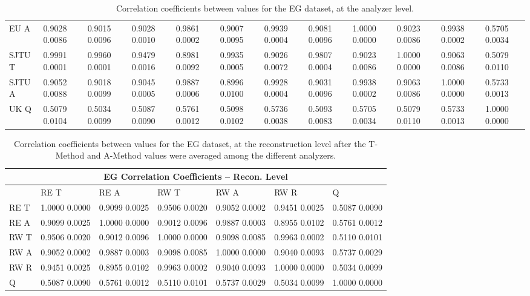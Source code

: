 \begin{landscape}
\begin{table}
\begin{tabularx}{1\linewidth}{@{\extracolsep{\fill}}lXXXXXXXXXXX}
	EU A   & 0.9028 0.0086 & 0.9015 0.0096 & 0.9028 0.0010 & 0.9861 0.0002 & 0.9007 0.0095 & 0.9939 0.0004 & 0.9081 0.0096 & 1.0000 0.0000 & 0.9023 0.0086 & 0.9938 0.0002 & 0.5705 0.0034  \\
	SJTU T & 0.9991 0.0001 & 0.9960 0.0001 & 0.9479 0.0016 & 0.8981 0.0092 & 0.9935 0.0005 & 0.9026 0.0072 & 0.9807 0.0004 & 0.9023 0.0086 & 1.0000 0.0000 & 0.9063 0.0086 & 0.5079 0.0110  \\
	SJTU A & 0.9052 0.0088 & 0.9018 0.0099 & 0.9045 0.0005 & 0.9887 0.0006 & 0.8996 0.0100 & 0.9928 0.0004 & 0.9031 0.0096 & 0.9938 0.0002 & 0.9063 0.0086 & 1.0000 0.0000 & 0.5733 0.0013  \\
	UK Q   & 0.5079 0.0104 & 0.5034 0.0099 & 0.5087 0.0090 & 0.5761 0.0012 & 0.5098 0.0102 & 0.5736 0.0038 & 0.5093 0.0083 & 0.5705 0.0034 & 0.5079 0.0110 & 0.5733 0.0013 & 1.0000 0.0000  \\
  \bottomrule
\end{tabularx}
\caption[]{Correlation coefficients between \R values for the EG dataset, at the analyzer level.}
\label{tab:Corrs_EG_analyzer}
\end{table}
\end{landscape}


\begin{table}
\setlength\tabcolsep{15pt}
\small
\centering
\renewcommand{\arraystretch}{1.4}
\begin{tabularx}{0.8\linewidth}{@{\extracolsep{\fill}}lXXXXXX}
  \toprule
  	\multicolumn{7}{c}{{\normalsize EG Correlation Coefficients -- Recon. Level}} \\
  \midrule
  	       & RE T & RE A & RW T & RW A & RW R & \quad Q \\
  \midrule
	RE T   & 1.0000 0.0000 & 0.9099 0.0025 & 0.9506 0.0020 & 0.9052 0.0002 & 0.9451 0.0025 & 0.5087 0.0090  \\
	RE A   & 0.9099 0.0025 & 1.0000 0.0000 & 0.9012 0.0096 & 0.9887 0.0003 & 0.8955 0.0102 & 0.5761 0.0012  \\
	RW T   & 0.9506 0.0020 & 0.9012 0.0096 & 1.0000 0.0000 & 0.9098 0.0085 & 0.9963 0.0002 & 0.5110 0.0101  \\
	RW A   & 0.9052 0.0002 & 0.9887 0.0003 & 0.9098 0.0085 & 1.0000 0.0000 & 0.9040 0.0093 & 0.5737 0.0029  \\
	RW R   & 0.9451 0.0025 & 0.8955 0.0102 & 0.9963 0.0002 & 0.9040 0.0093 & 1.0000 0.0000 & 0.5034 0.0099  \\
	Q      & 0.5087 0.0090 & 0.5761 0.0012 & 0.5110 0.0101 & 0.5737 0.0029 & 0.5034 0.0099 & 1.0000 0.0000  \\
  \bottomrule
\end{tabularx}
\caption[]{Correlation coefficients between \R values for the EG dataset, at the reconstruction level after the \RW T-Method and A-Method \R values were averaged among the different analyzers.}
\label{tab:Corrs_EG_recon}
\end{table}


